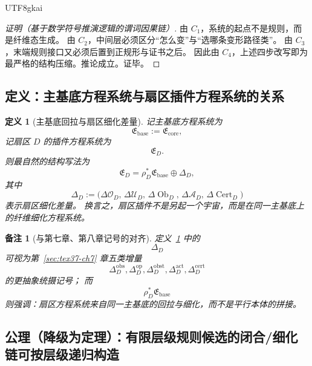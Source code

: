 \documentclass[12pt]{article}
\newtheorem{definition}{定义}[section]
\newtheorem{remark}{备注}[section]
\newcommand{\Ob}{\operatorname{Ob}}
\newcommand{\Cert}{\operatorname{Cert}}
\begin{document}
\begin{CJK*}{UTF8}{gkai}
\begin{proof}[证明（基于数学符号推演逻辑的谓词因果链）]
由 $C_1$，系统的起点不是规则，而是纤维态生成。
由 $C_2$，中间层必须区分“怎么变”与“选哪条变形路径类”。
由 $C_3$，末端规则接口又必须后置到正规形与证书之后。
因此由 $C_4$，上述四步改写即为最严格的结构压缩。推论成立。证毕。
\end{proof}

\subsection{定义：主基底方程系统与扇区插件方程系统的关系}
\label{subsec:tex37-ch12-def2}

\begin{definition}[主基底回拉与扇区细化差量]
\label{def:tex37-ch12-base-sector}
记主基底方程系统为
\[
  \mathfrak E_{\mathrm{base}}
  :=
  \mathfrak E_{\mathrm{core}},
\]
记扇区 $D$ 的插件方程系统为
\[
  \mathfrak E_D.
\]
则最自然的结构写法为
\[
  \mathfrak E_D
  =
  \rho_D^\ast \mathfrak E_{\mathrm{base}}
  \oplus
  \Delta_D,
\]
其中
\[
  \Delta_D
  :=
  \bigl(
    \Delta\mathcal O_D,\,
    \Delta\mathcal U_D,\,
    \Delta\Ob_D,\,
    \Delta\mathcal A_D,\,
    \Delta\Cert_D
  \bigr)
\]
表示扇区细化差量。
换言之，扇区插件不是另起一个宇宙，而是在同一主基底上的纤维细化方程系统。
\end{definition}

\begin{remark}[与第七章、第八章记号的对齐]
定义~\ref{def:tex37-ch12-base-sector} 中的
\[
  \Delta_D
\]
可视为第~\ref{sec:tex37-ch7} 章五类增量
\[
  \Delta_D^{\mathrm{obs}},
  \Delta_D^{\mathrm{op}},
  \Delta_D^{\mathrm{obst}},
  \Delta_D^{\mathrm{act}},
  \Delta_D^{\mathrm{cert}}
\]
的更抽象统摄记号；
而
\[
  \rho_D^\ast \mathfrak E_{\mathrm{base}}
\]
则强调：扇区方程系统来自同一主基底的回拉与细化，而不是平行本体的拼接。
\end{remark}

\subsection{公理（降级为定理）：有限层级规则候选的闭合/细化链可按层级递归构造}
\label{subsec:tex37-ch12-axiom}


\end{CJK*}
\end{document}
